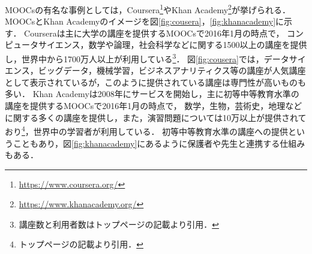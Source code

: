 \begin{figure}[htb]
\begin{center}
\hspace*{-40pt}
\end{center}
\end{figure}
MOOCsの有名な事例としては，Coursera\footnote{\url{https://www.coursera.org/}}やKhan Academy\footnote{\url{https://www.khanacademy.org/}}が挙げられる．
MOOCsとKhan Academyのイメージを図\ref{fig:cousera}，\ref{fig:khanacademy}に示す．
Courseraは主に大学の講座を提供するMOOCsで2016年1月の時点で，
コンピュータサイエンス，数学や論理，社会科学などに関する1500以上の講座を提供し，世界中から1700万人以上が利用している\footnote{講座数と利用者数はトップページの記載より引用．}．
図\ref{fig:cousera}では，データサイエンス，ビッグデータ，機械学習，ビジネスアナリティクス等の講座が人気講座として表示されているが，このように提供されている講座は専門性が高いものも多い．
Khan Academyは2008年にサービスを開始し，主に初等中等教育水準の講座を提供するMOOCsで2016年1月の時点で，
数学，生物，芸術史，地理などに関する多くの講座を提供し，また，演習問題については10万以上が提供されており\footnote{トップページの記載より引用．}，世界中の学習者が利用している．
初等中等教育水準の講座への提供ということもあり，図\ref{fig:khanacademy}にあるように保護者や先生と連携する仕組みもある．




